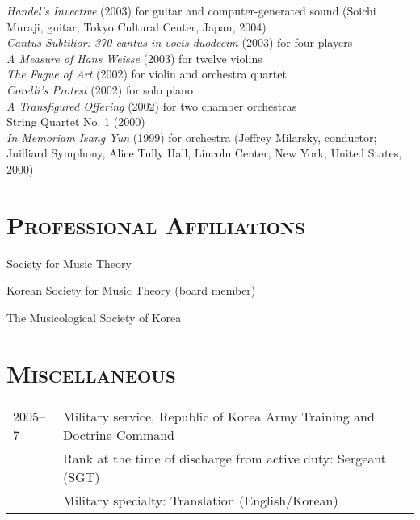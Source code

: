 \documentclass[a4paper,11pt,draft]{article}
\begin{document}
  \begin{hangparas}{15pt}{1}
    \textit{Handel’s Invective} (2003) for guitar and computer-generated sound (Soichi Muraji, guitar; Tokyo Cultural Center, Japan, 2004)\\[2mm]
  
    \textit{Cantus Subtilior: 370 cantus in vocis duodecim} (2003) for four players\\[2mm]
  
    \textit{A Measure of Hans Weisse} (2003) for twelve violins\\[2mm]
  
    \textit{The Fugue of Art} (2002) for violin and orchestra quartet\\[2mm]
  
    \textit{Corelli’s Protest} (2002) for solo piano\\[2mm]
  
    \textit{A Transfigured Offering} (2002) for two chamber orchestras\\[2mm]
  
    String Quartet No. 1 (2000)\\[2mm]
  
    \textit{In Memoriam Isang Yun} (1999) for orchestra (Jeffrey Milarsky, conductor; Juilliard Symphony, Alice Tully Hall, Lincoln Center, New York, United States, 2000)
  \end{hangparas}
  
  \vspace{5.0mm}
  
  \section*{\textsc{Professional Affiliations}}
  
  Society for Music Theory
  
  \noindent Korean Society for Music Theory (board member)
  
  \noindent The Musicological Society of Korea
  
  \section*{\textsc{Miscellaneous}}
  
  \hspace*{-0.25cm}
  \begin{tabular}{p{2.5cm} l}
    2005–7 & Military service, Republic of Korea Army Training and Doctrine Command\\
    & Rank at the time of discharge from active duty: Sergeant (SGT)\\
    & Military specialty: Translation (English/Korean)
  \end{tabular}
\end{document}
